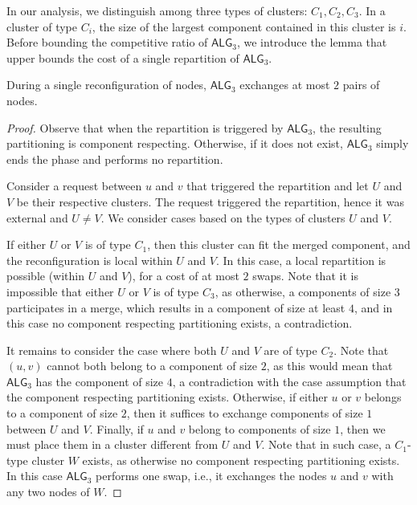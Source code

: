\documentclass[manuscript,screen=true, review, anonymous]{acmart}
\newcommand{\TAlg}{{\ensuremath{\textsf{ALG}_{3}}}\xspace}
\begin{document}
In our analysis, we distinguish among three types of clusters: $C_1, C_2, C_3$. In a cluster of type $C_i$, the size of the largest component contained in this cluster is $i$.
Before bounding the competitive ratio of \TAlg, we introduce the lemma that upper bounds the cost of a single repartition of \TAlg.

\begin{lemma}
	\label{lem:1req}
	During a single reconfiguration of nodes, \TAlg exchanges at most $2$ pairs of nodes.
\end{lemma}

\begin{proof}
	Observe that when the repartition is triggered by \TAlg, the resulting partitioning is component respecting.
	Otherwise, if it does not exist, \TAlg simply ends the phase and performs no repartition.
	
	
	Consider a request between $u$ and $v$ that triggered the repartition and let $U$ and $V$ be their respective clusters.
	The request triggered the repartition, hence it was external and $U\neq V$.
	We consider cases based on the types of clusters $U$ and $V$.
	
	If either $U$ or $V$ is of type $C_1$, then this cluster can fit the merged component, and the reconfiguration is local within $U$ and $V$.
	In this case, a local repartition is possible (within $U$ and $V$), for a cost of at most $2$ swaps.
	Note that it is impossible that either $U$ or $V$ is of type $C_3$, as otherwise, a components of size $3$ participates in a merge, which results in a component of size at least $4$, and in this case no component respecting partitioning exists, a contradiction.
	
	
	It remains to consider the case where both $U$ and $V$ are of type $C_2$. Note that $(u,v)$ cannot both belong to a component of size $2$, as this would mean that \TAlg has the component of size $4$, a contradiction with the case assumption that the component respecting partitioning exists. 
	Otherwise, if either $u$ or $v$ belongs to a component of size $2$, then it suffices to exchange components of size $1$ between $U$ and $V$.
	Finally, if $u$ and $v$ belong to components of size $1$, then we must place them in a cluster different from $U$ and $V$.
	Note that in such case, a $C_1$-type cluster $W$ exists, as otherwise no component respecting partitioning exists. In this case \TAlg performs one swap, i.e., it exchanges the nodes $u$ and $v$ with any two nodes of $W$.
\end{proof}
\end{document}
